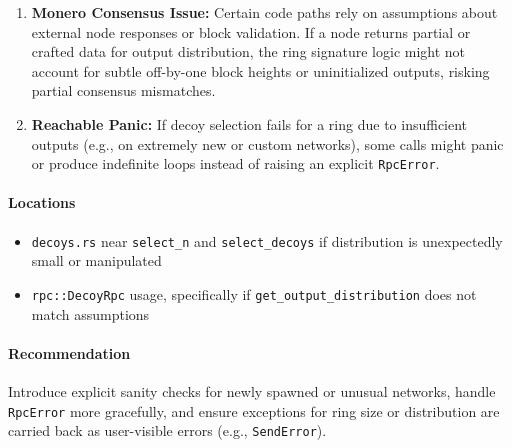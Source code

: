 \documentclass[12pt,a4paper]{article}
\begin{document}
\begin{enumerate}
  \item \textbf{Monero Consensus Issue:} Certain code paths rely on assumptions about 
  external node responses or block validation. If a node returns partial or crafted 
  data for output distribution, the ring signature logic might not account for 
  subtle off-by-one block heights or uninitialized outputs, risking partial 
  consensus mismatches.  

  \item \textbf{Reachable Panic:} If decoy selection fails for a ring due to 
  insufficient outputs (e.g., on extremely new or custom networks), some calls 
  might panic or produce indefinite loops instead of raising an explicit 
  \texttt{RpcError}. 
\end{enumerate}

\paragraph{Locations}
\begin{itemize}
  \item \verb|decoys.rs| near \texttt{select_n} and \texttt{select_decoys} if distribution 
  is unexpectedly small or manipulated
  \item \verb|rpc::DecoyRpc| usage, specifically if \texttt{get_output_distribution} 
  does not match assumptions
\end{itemize}

\paragraph{Recommendation}
Introduce explicit sanity checks for newly spawned or unusual networks, handle 
\texttt{RpcError} more gracefully, and ensure exceptions for ring size or 
distribution are carried back as user-visible errors (e.g., \texttt{SendError}).

\end{document}
